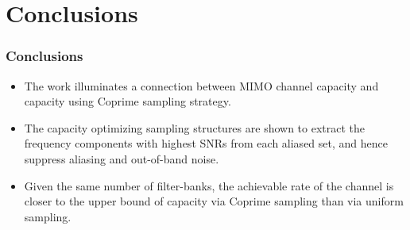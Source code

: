 \documentclass{beamer}
\begin{document}
\section{Conclusions}

\begin{frame}
\frametitle{Conclusions}
\begin{itemize}
  \item The work illuminates a connection between MIMO channel capacity and capacity using Coprime sampling strategy.
  \item The capacity optimizing sampling structures are shown to extract the frequency components with highest SNRs from each aliased set, and hence suppress aliasing and out-of-band noise.
  \item Given the same number of filter-banks, the achievable rate of the channel is closer to the upper bound of capacity via Coprime sampling than via uniform sampling.
\end{itemize}
\end{frame}

%
%
%
%
%
\end{document}
